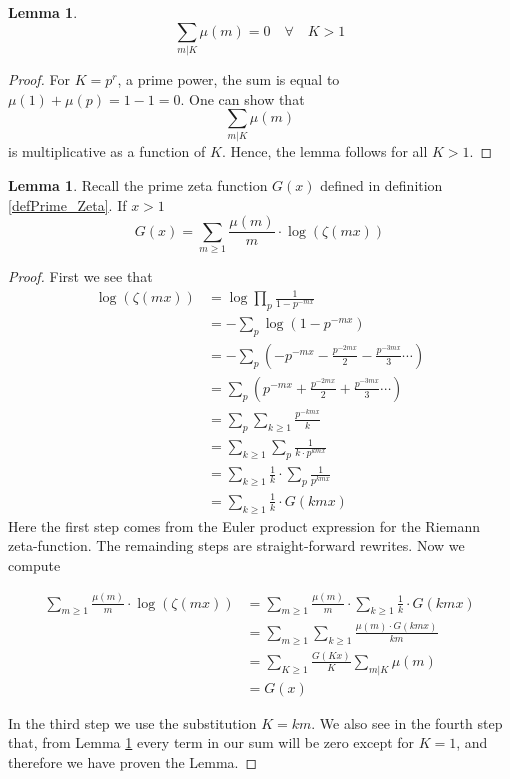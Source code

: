 \documentclass{article}
\theoremstyle{definition}
\newtheorem{lemma}[theorem]{Lemma}
\theoremstyle{remark}
\begin{document}
\begin{lemma}\label{moebius lik 0}
\begin{equation}
\sum_{m\vert K}\mu(m) = 0 \quad \forall \quad K>1
\end{equation}
\end{lemma}
\begin{proof}
For $K=p^r$, a prime power, the sum is equal to $\mu(1)+\mu(p)=1-1=0$. One can show that
$$\sum_{m \vert K}\mu(m)$$
is multiplicative as a function of $K$. Hence, the lemma follows for all $K > 1$.
\end{proof}

\begin{lemma} \label{G to moebius}
Recall the prime zeta function $G(x)$ defined in definition \ref{defPrime_Zeta}. If $x>1$
$$G(x)=\sum_{m\geq 1}\frac{\mu(m)}{m}\cdot \log(\zeta(mx))$$
\end{lemma}
\begin{proof}
First we see that %
\begin{equation} \label{eq3}
\begin{split}
\log(\zeta(mx)) & = \log \prod_p \frac{1}{1-p^{-mx}} \\
 & = -\sum_p \log(1-p^{-mx}) \\
 & = -\sum_p(-p^{-mx}-\frac{p^{-2mx}}{2}-\frac{p^{-3mx}}{3}\cdots)\\
 & = \sum_p(p^{-mx}+\frac{p^{-2mx}}{2}+\frac{p^{-3mx}}{3}\cdots) \\
 & = \sum_p\sum_{k\geq 1}\frac{p^{-kmx}}{k} \\
 & = \sum_{k\geq 1} \sum_p \frac{1}{k\cdot p^{kmx}} \\
 & = \sum_{k\geq 1} \frac{1}{k}\cdot \sum_p \frac{1}{ p^{kmx}} \\
 & = \sum_{k\geq 1} \frac{1}{k}\cdot G(kmx)
\end{split}
\end{equation}
Here the first step comes from the Euler product expression for the Riemann zeta-function. The remainding steps are straight-forward rewrites.
\newline
Now we compute

\begin{equation} \label{eq4}
\begin{split}
\sum_{m\geq 1}\frac{\mu(m)}{m}\cdot \log(\zeta(mx)) & = \sum_{m\geq 1}\frac{\mu(m)}{m}\cdot  \sum_{k\geq 1} \frac{1}{k}\cdot G(kmx) \\
& = \sum_{m\geq 1}  \sum_{k\geq 1}\frac{\mu(m)\cdot G(kmx)}{km} \\
& = \sum_{K\geq 1}\frac{G(Kx)}{K}\sum_{m\vert K}\mu(m) \\
& = G(x)
\end{split}
\end{equation}

In the third step we use the substitution $K=km$. We also see in the fourth step that, from Lemma \ref{moebius lik 0} every term in our sum will be zero except for $K=1$, and therefore we have proven the Lemma.
\end{proof}
\end{document}
